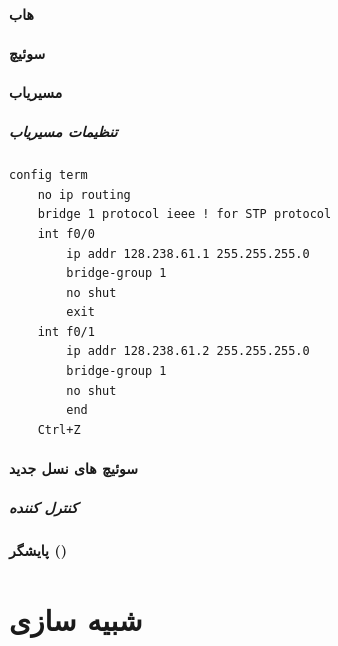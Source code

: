 \documentclass{../UTNetLabFa}
\begin{document}
\subsection{هاب}
\subsection{سوئیچ}
\subsection{مسیریاب}
\subsubsection{تنظیمات مسیریاب}
{
	\begin{lstlisting}[language=cisco,caption=\FR{تنظیمات مسیریاب}]
config term
	no ip routing
	bridge 1 protocol ieee ! for STP protocol
	int f0/0
		ip addr 128.238.61.1 255.255.255.0
		bridge-group 1
		no shut
		exit
	int f0/1
		ip addr 128.238.61.2 255.255.255.0
		bridge-group 1
		no shut
		end
	Ctrl+Z
\end{lstlisting}
}
\subsection{سوئیچ های نسل جدید}
\subsubsection{کنترل کننده}
\subsection{پایشگر ()}

\part{شبیه سازی}
\end{document}
